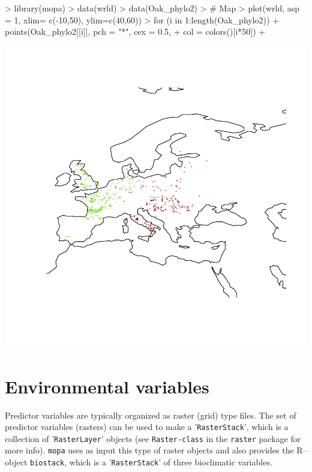 \documentclass[10pt,a4paper]{article}
\begin{document}
\begin{Schunk}
\begin{Sinput}
> library(mopa)
> data(wrld)
> data(Oak_phylo2)
> # Map 
> plot(wrld, asp = 1, xlim= c(-10,50), ylim=c(40,60))
> for (i in 1:length(Oak_phylo2)) {
+   points(Oak_phylo2[[i]], pch = "*", cex = 0.5, 
+          col = colors()[i*50])
+ }
\end{Sinput}
\end{Schunk}
\includegraphics{mopa-mopa2}

\section{Environmental variables}

Predictor variables are typically organized as raster (grid) type files. The set of predictor variables (rasters) can be used to make a '\texttt{RasterStack}', which is a collection of '\texttt{RasterLayer}' objects (see \texttt{Raster-class} in the \texttt{raster} package for more info). \texttt{mopa} uses as input this type of raster objects and also provides the R--object \texttt{biostack}, which is a '\texttt{RasterStack}' of three bioclimatic variables.
\end{document}
